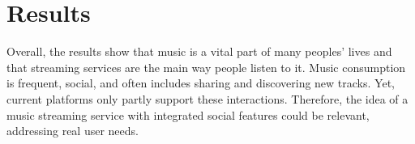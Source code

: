 \section{Results}
Overall, the results show that music is a vital part of many peoples' lives
and that streaming services are the main way people listen to it.
Music consumption is frequent, social, and often includes sharing and discovering new tracks.
Yet, current platforms only partly support these interactions.
Therefore, the idea of a music streaming service with integrated social features could be relevant,
addressing real user needs.


\begin{table}[ht]
    \label{tab:where_listen}
\end{table}